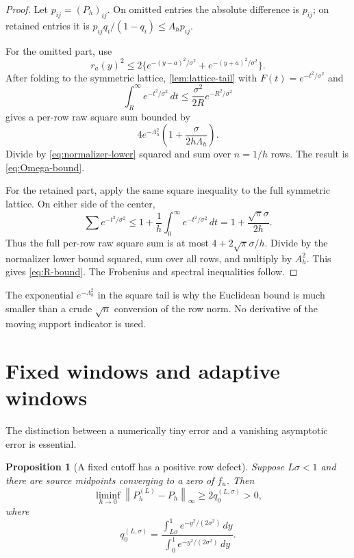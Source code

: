 \documentclass[11pt]{article}
\newtheorem{proposition}[theorem]{Proposition}
\theoremstyle{definition}
\theoremstyle{remark}
\newcommand{\norm}[1]{\left\lVert #1\right\rVert}
\begin{document}
\begin{proof}
Let $p_{ij}=(P_h)_{ij}$.  On omitted entries the absolute difference is
$p_{ij}$; on retained entries it is
$p_{ij}q_i/(1-q_i)\le A_hp_{ij}$.

For the omitted part, use
\[
r_a(y)^2
\le2\{e^{-(y-a)^2/\sigma^2}+e^{-(y+a)^2/\sigma^2}\}.
\]
After folding to the symmetric lattice, \cref{lem:lattice-tail} with
$F(t)=e^{-t^2/\sigma^2}$ and
\[
\int_R^\infty e^{-t^2/\sigma^2}\,dt
\le\frac{\sigma^2}{2R}e^{-R^2/\sigma^2}
\]
gives a per-row raw square sum bounded by
\[
4e^{-\Lambda_h^2}
\left(1+\frac{\sigma}{2h\Lambda_h}\right).
\]
Divide by \eqref{eq:normalizer-lower} squared and sum over $n=1/h$ rows.
The result is \eqref{eq:Omega-bound}.

For the retained part, apply the same square inequality to the full symmetric
lattice.  On either side of the center,
\[
\sum e^{-t^2/\sigma^2}
\le1+\frac1h\int_0^\infty e^{-t^2/\sigma^2}\,dt
=1+\frac{\sqrt\pi\sigma}{2h}.
\]
Thus the full per-row raw square sum is at most
$4+2\sqrt\pi\sigma/h$.  Divide by the normalizer lower bound squared, sum
over all rows, and multiply by $A_h^2$.  This gives
\eqref{eq:R-bound}.  The Frobenius and spectral inequalities follow.
\end{proof}

The exponential $e^{-\Lambda_h^2}$ in the square tail is why the Euclidean
bound is much smaller than a crude $\sqrt n$ conversion of the row norm.
No derivative of the moving support indicator is used.

\section{Fixed windows and adaptive windows}
\label{sec:schedules}

The distinction between a numerically tiny error and a vanishing asymptotic
error is essential.

\begin{proposition}[A fixed cutoff has a positive row defect]
\label{prop:fixed-obstruction}
Suppose $L\sigma<1$ and there are source midpoints converging to a zero of
$f_u$.  Then
\begin{equation}
\liminf_{h\to0}
\norm{P_h^{(L)}-P_h}_\infty
\ge2q_0^{(L,\sigma)}>0,
\label{eq:fixed-obstruction}
\end{equation}
where
\begin{equation}
q_0^{(L,\sigma)}
=
\frac{\displaystyle\int_{L\sigma}^{1}
e^{-y^2/(2\sigma^2)}\,dy}
{\displaystyle\int_{0}^{1}
e^{-y^2/(2\sigma^2)}\,dy}.
\label{eq:continuum-tail}
\end{equation}
\end{proposition}
\end{document}
